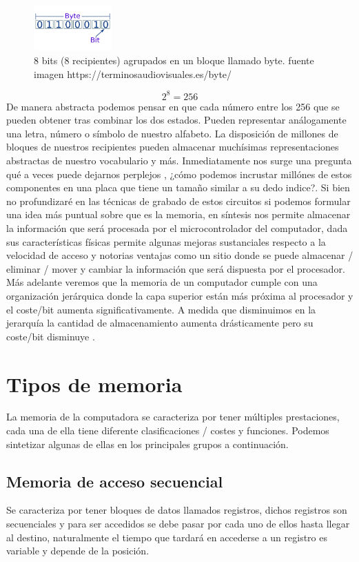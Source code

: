 \documentclass{article}
\begin{document}
\begin{figure}[h]
\includegraphics[width=3cm]{images/byte.png}
\centering
\caption{8 bits (8 recipientes)  agrupados en un bloque llamado byte. fuente imagen https://terminosaudiovisuales.es/byte/}
\label{fig:byte}
\end{figure}
\[2^{8}=256 \]
De manera abstracta podemos pensar en que cada número entre los 256 que se pueden obtener tras combinar los dos estados. Pueden representar 
 análogamente una letra, número o símbolo de nuestro alfabeto. La disposición de millones de bloques de nuestros recipientes pueden almacenar muchísimas representaciones abstractas de nuestro vocabulario y más.
Inmediatamente nos surge una pregunta qué a veces puede dejarnos perplejos , ¿cómo podemos incrustar millónes
 de estos componentes en una placa que tiene un tamaño similar a su dedo indice?. Si bien no profundizaré en las técnicas de grabado de estos circuitos si podemos formular una idea más puntual sobre que es la memoria, en síntesis nos permite almacenar la información que será procesada por el microcontrolador del computador, dada sus características físicas permite algunas mejoras sustanciales  
respecto a la velocidad de acceso y notorias ventajas como un sitio donde se puede almacenar / eliminar / mover y cambiar la información que será dispuesta por el procesador. Más adelante veremos que la memoria de un computador cumple con una organización jerárquica donde la capa superior están  
más próxima al procesador y el coste/bit aumenta significativamente. A medida que disminuimos en la jerarquía la cantidad de almacenamiento aumenta drásticamente pero su coste/bit disminuye
.\newline 

\section{Tipos de memoria}

La memoria de la computadora se caracteriza por tener múltiples prestaciones, cada una de ella tiene diferente clasificaciones / costes y funciones. Podemos sintetizar algunas de ellas en los principales grupos a continuación.\newline 

\subsection{Memoria de acceso secuencial}
Se caracteriza por tener bloques de datos llamados registros, dichos registros son secuenciales y para ser accedidos se debe pasar por cada uno de ellos hasta llegar al destino, naturalmente el tiempo que tardará en accederse a un registro es variable y depende de la posición.
\end{document}
